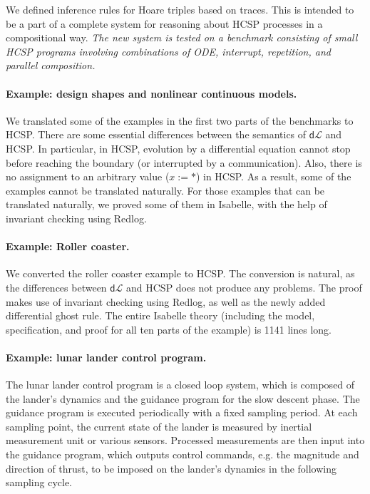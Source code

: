 \documentclass[runningheads,a4paper]{llncs}
\newcommand{\dL}{\mathsf{d}\mathcal{L}}
\begin{document}
We defined inference rules for Hoare triples based on traces. This is intended to be a part of a complete system for reasoning about HCSP processes in a compositional way. \emph{The new system is tested on a benchmark consisting of small HCSP programs involving combinations of ODE, interrupt, repetition, and parallel composition.}
 


\paragraph{Example: design shapes and nonlinear continuous models.}

We translated some of the examples in the first two parts of the
benchmarks to HCSP. There are some essential differences between the
semantics of $\dL$ and HCSP. In particular, in HCSP, evolution by a
differential equation cannot stop before reaching the boundary (or
interrupted by a communication). Also, there is no assignment to an
arbitrary value ($x := *$) in HCSP. As a result, some of the examples
cannot be translated naturally. For those examples that can be
translated naturally, we proved some of them in Isabelle, with the
help of invariant checking using Redlog.

\paragraph{Example: Roller coaster.}

We converted the roller coaster example \cite{coasterx} to HCSP. The
conversion is natural, as the differences between $\dL$ and HCSP does
not produce any problems. The proof makes use of invariant checking
using Redlog, as well as the newly added differential ghost rule. The
entire Isabelle theory (including the model, specification, and proof
for all ten parts of the example) is 1141 lines long.

\paragraph{Example: lunar lander control program.}

The lunar lander control program is a closed loop system, which is
composed of the lander's dynamics and the guidance program for the
slow descent phase. The guidance program is executed periodically with
a fixed sampling period. At each sampling point, the current state of
the lander is measured by inertial measurement unit or various
sensors. Processed measurements are then input into the guidance
program, which outputs control commands, e.g. the magnitude and
direction of thrust, to be imposed on the lander's dynamics in the
following sampling cycle.
\end{document}

